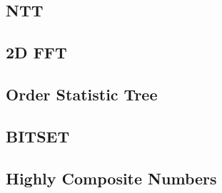 \documentclass[10pt,landscape,a4paper,twocolumn]{article}
\begin{document}
\subsection{NTT}


\subsection{2D FFT}


\subsection{Order Statistic Tree}


\subsection{BITSET}


\subsection{Highly Composite Numbers}

\end{document}
